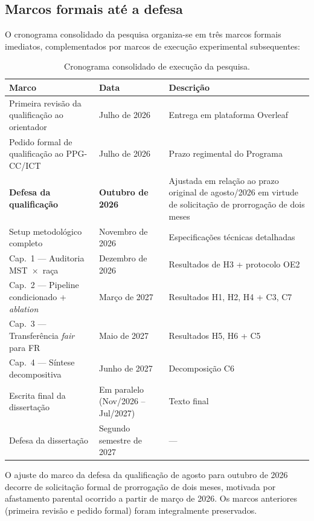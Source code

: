 \subsection{Marcos formais até a defesa}
\label{sec:cron_marcos}

O cronograma consolidado da pesquisa organiza-se em três marcos formais imediatos, complementados por marcos de execução experimental subsequentes:

\begin{table}[htbp]
\centering
\small
\begin{tabular}{p{6.5cm}p{2.8cm}p{5.5cm}}
\toprule
\textbf{Marco} & \textbf{Data} & \textbf{Descrição} \\
\midrule
Primeira revisão da qualificação ao orientador & Julho de 2026 & Entrega em plataforma Overleaf \\
Pedido formal de qualificação ao PPG-CC/ICT & Julho de 2026 & Prazo regimental do Programa \\
\textbf{Defesa da qualificação} & \textbf{Outubro de 2026} & Ajustada em relação ao prazo original de agosto/2026 em virtude de solicitação de prorrogação de dois meses \\
Setup metodológico completo & Novembro de 2026 & Especificações técnicas detalhadas \\
Cap.~1 --- Auditoria MST~$\times$~raça & Dezembro de 2026 & Resultados de H3 + protocolo OE2 \\
Cap.~2 --- Pipeline condicionado + \emph{ablation} & Março de 2027 & Resultados H1, H2, H4 + C3, C7 \\
Cap.~3 --- Transferência \emph{fair} para FR & Maio de 2027 & Resultados H5, H6 + C5 \\
Cap.~4 --- Síntese decompositiva & Junho de 2027 & Decomposição C6 \\
Escrita final da dissertação & Em paralelo (Nov/2026 -- Jul/2027) & Texto final \\
Defesa da dissertação & Segundo semestre de 2027 & --- \\
\bottomrule
\end{tabular}
\caption{Cronograma consolidado de execução da pesquisa.}
\label{tab:cronograma}
\end{table}

O ajuste do marco da defesa da qualificação de agosto para outubro de 2026 decorre de solicitação formal de prorrogação de dois meses, motivada por afastamento parental ocorrido a partir de março de 2026. Os marcos anteriores (primeira revisão e pedido formal) foram integralmente preservados.

